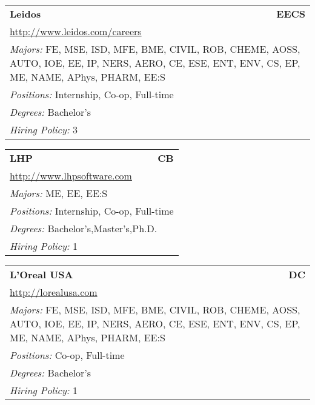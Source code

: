 \documentclass[twoside]{article}
\begin{document}
\begin{center}
\begin{multicols}{3}
\begin{FlushLeft}
\begin{minipage}{\columnwidth}\begin{tabularx}{.95\columnwidth}{Xr}
                 {\Large\bf Leidos} & {\Large\bf EECS}\\
    \multicolumn{2}{p{.95\columnwidth}}{\url{http://www.leidos.com/careers}}\\
    \multicolumn{2}{p{.95\columnwidth}}{\emph{Majors:} FE, MSE, ISD, MFE, BME, CIVIL, ROB, CHEME, AOSS, AUTO, IOE, EE, IP, NERS, AERO, CE, ESE, ENT, ENV, CS, EP, ME, NAME, APhys, PHARM, EE:S}\\
    \multicolumn{2}{p{.95\columnwidth}}{\emph{Positions:} Internship, Co-op, Full-time}\\
    \multicolumn{2}{p{.95\columnwidth}}{\emph{Degrees:} Bachelor's}\\
    \multicolumn{2}{p{.95\columnwidth}}{\emph{Hiring Policy:} 3}\\
    \end{tabularx}
    
\end{minipage}
 
\begin{minipage}{\columnwidth}\begin{tabularx}{.95\columnwidth}{Xr}
                 {\Large\bf LHP} & {\Large\bf CB}\\
    \multicolumn{2}{p{.95\columnwidth}}{\url{http://www.lhpsoftware.com}}\\
    \multicolumn{2}{p{.95\columnwidth}}{\emph{Majors:} ME, EE, EE:S}\\
    \multicolumn{2}{p{.95\columnwidth}}{\emph{Positions:} Internship, Co-op, Full-time}\\
    \multicolumn{2}{p{.95\columnwidth}}{\emph{Degrees:} Bachelor's,Master's,Ph.D.}\\
    \multicolumn{2}{p{.95\columnwidth}}{\emph{Hiring Policy:} 1}\\
    \end{tabularx}
    
\end{minipage}
 
\begin{minipage}{\columnwidth}\begin{tabularx}{.95\columnwidth}{Xr}
                 {\Large\bf L'Oreal USA} & {\Large\bf DC}\\
    \multicolumn{2}{p{.95\columnwidth}}{\url{http://lorealusa.com}}\\
    \multicolumn{2}{p{.95\columnwidth}}{\emph{Majors:} FE, MSE, ISD, MFE, BME, CIVIL, ROB, CHEME, AOSS, AUTO, IOE, EE, IP, NERS, AERO, CE, ESE, ENT, ENV, CS, EP, ME, NAME, APhys, PHARM, EE:S}\\
    \multicolumn{2}{p{.95\columnwidth}}{\emph{Positions:} Co-op, Full-time}\\
    \multicolumn{2}{p{.95\columnwidth}}{\emph{Degrees:} Bachelor's}\\
    \multicolumn{2}{p{.95\columnwidth}}{\emph{Hiring Policy:} 1}\\
    \end{tabularx}
    

\end{minipage}
\end{FlushLeft}
\end{multicols}
\end{center}
\end{document}
